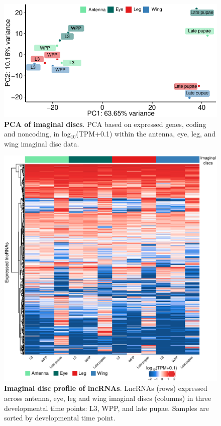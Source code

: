 \begin{figure}[ht!]
  \centering
  \includegraphics[scale=0.9]{plots/appendix/dme/erc.pca.pdf}
  \caption[PCA of imaginal discs]{\textbf{PCA of imaginal discs}. PCA based on expressed genes, coding and noncoding, in log$_{10}$(TPM+0.1) within the antenna, eye, leg, and wing imaginal disc data.}
  \label{supp-fig:pca-erc}
\end{figure}

\begin{figure}[ht!]
  \centering
  \includegraphics[scale=0.7]{plots/appendix/dme/all.lncRNA.exp.erc.pdf}
  \caption[Imaginal disc profile of lncRNAs]{\textbf{Imaginal disc profile of lncRNAs}. LncRNAs (rows) expressed across antenna, eye, leg and wing imaginal discs (columns) in three developmental time points: L3, WPP, and late pupae. Samples are sorted by developmental time point.}
  \label{fig:heatmap-erc-all}
\end{figure}

